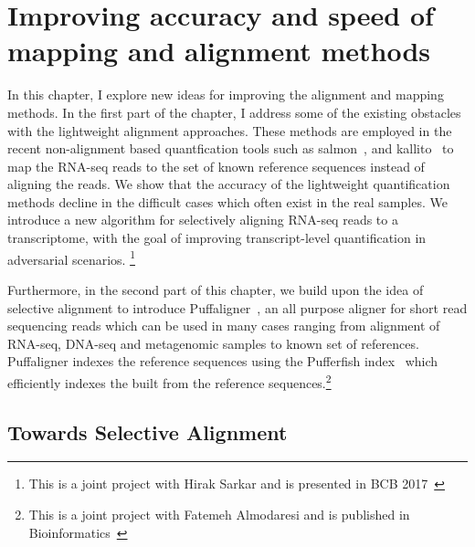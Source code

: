 
\renewcommand{\thechapter}{2}

\chapter[Alignment and mapping metods]
{Improving accuracy and speed of mapping and alignment methods}
\label{chapt:puffaligner}

In this chapter, I explore new ideas for improving the alignment and mapping methods. 
In the first part of the chapter, I address some of the existing obstacles with the 
lightweight  alignment approaches. These methods are employed in the recent non-alignment 
based quantfication tools such as salmon~\citep{Patro2017Salmon}, and 
kallito~\citep{Bray2016Kallisto} to map the RNA-seq reads to the set of known reference 
sequences instead of aligning the reads. We show that the accuracy of the lightweight 
quantification methods decline in the difficult cases which often exist in the real 
samples. We introduce a new algorithm for selectively aligning RNA-seq reads to a 
transcriptome, with the goal of improving transcript-level quantification in adversarial 
scenarios.
\footnote{This is a joint project with Hirak Sarkar and is presented in BCB 2017~\citep{selaln}}

Furthermore, in the second part of this chapter, we build upon the idea of selective 
alignment to introduce Puffaligner~\citep{almodaresi2021puffaligner}, an all purpose 
aligner for short read sequencing reads which can be used in many cases ranging from 
alignment of RNA-seq, DNA-seq and metagenomic samples to known set of references. 
Puffaligner indexes the reference sequences using the Pufferfish index~\citep{pufferfish} 
which efficiently indexes the \cdbg built from the reference sequences.\footnote{This is 
a joint project with Fatemeh Almodaresi and is published in 
Bioinformatics~\citep{almodaresi2021puffaligner}}


\section{Towards Selective Alignment}

